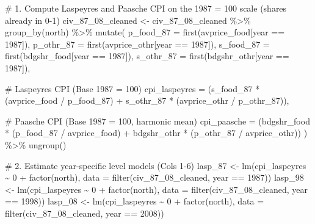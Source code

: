\documentclass[
  letterpaper,
  DIV=11,
  numbers=noendperiod]{scrartcl}
\newenvironment{Shaded}{\begin{snugshade}}{\end{snugshade}}
\newcommand{\AttributeTok}[1]{\textcolor[rgb]{0.40,0.45,0.13}{#1}}
\newcommand{\CommentTok}[1]{\textcolor[rgb]{0.37,0.37,0.37}{#1}}
\newcommand{\DecValTok}[1]{\textcolor[rgb]{0.68,0.00,0.00}{#1}}
\newcommand{\FunctionTok}[1]{\textcolor[rgb]{0.28,0.35,0.67}{#1}}
\newcommand{\NormalTok}[1]{\textcolor[rgb]{0.00,0.23,0.31}{#1}}
\newcommand{\OtherTok}[1]{\textcolor[rgb]{0.00,0.23,0.31}{#1}}
\newcommand{\SpecialCharTok}[1]{\textcolor[rgb]{0.37,0.37,0.37}{#1}}
\begin{document}
\begin{Shaded}
\begin{Highlighting}[]
\CommentTok{\# 1. Compute Laspeyres and Paasche CPI on the 1987 = 100 scale (shares already in 0{-}1)}
\NormalTok{civ\_87\_08\_cleaned }\OtherTok{\textless{}{-}}\NormalTok{ civ\_87\_08\_cleaned }\SpecialCharTok{\%\textgreater{}\%}
  \FunctionTok{group\_by}\NormalTok{(north) }\SpecialCharTok{\%\textgreater{}\%}
  \FunctionTok{mutate}\NormalTok{(}
    \AttributeTok{p\_food\_87 =} \FunctionTok{first}\NormalTok{(avprice\_food[year }\SpecialCharTok{==} \DecValTok{1987}\NormalTok{]),}
    \AttributeTok{p\_othr\_87 =} \FunctionTok{first}\NormalTok{(avprice\_othr[year }\SpecialCharTok{==} \DecValTok{1987}\NormalTok{]),}
    \AttributeTok{s\_food\_87 =} \FunctionTok{first}\NormalTok{(bdgshr\_food[year }\SpecialCharTok{==} \DecValTok{1987}\NormalTok{]),}
    \AttributeTok{s\_othr\_87 =} \FunctionTok{first}\NormalTok{(bdgshr\_othr[year }\SpecialCharTok{==} \DecValTok{1987}\NormalTok{]),}
    
    \CommentTok{\# Laspeyres CPI (Base 1987 = 100)}
    \AttributeTok{cpi\_laspeyres =}\NormalTok{ (s\_food\_87 }\SpecialCharTok{*}\NormalTok{ (avprice\_food }\SpecialCharTok{/}\NormalTok{ p\_food\_87) }\SpecialCharTok{+}
\NormalTok{                           s\_othr\_87 }\SpecialCharTok{*}\NormalTok{ (avprice\_othr }\SpecialCharTok{/}\NormalTok{ p\_othr\_87)),}
    
    \CommentTok{\# Paasche CPI (Base 1987 = 100, harmonic mean)}
    \AttributeTok{cpi\_paasche =}\NormalTok{ (bdgshr\_food }\SpecialCharTok{*}\NormalTok{ (p\_food\_87 }\SpecialCharTok{/}\NormalTok{ avprice\_food) }\SpecialCharTok{+}
\NormalTok{                           bdgshr\_othr }\SpecialCharTok{*}\NormalTok{ (p\_othr\_87 }\SpecialCharTok{/}\NormalTok{ avprice\_othr))}
\NormalTok{  ) }\SpecialCharTok{\%\textgreater{}\%}
  \FunctionTok{ungroup}\NormalTok{()}

\CommentTok{\# 2. Estimate year{-}specific level models (Cols 1{-}6)}
\NormalTok{lasp\_87 }\OtherTok{\textless{}{-}} \FunctionTok{lm}\NormalTok{(cpi\_laspeyres }\SpecialCharTok{\textasciitilde{}} \DecValTok{0} \SpecialCharTok{+} \FunctionTok{factor}\NormalTok{(north), }\AttributeTok{data =} \FunctionTok{filter}\NormalTok{(civ\_87\_08\_cleaned, year }\SpecialCharTok{==} \DecValTok{1987}\NormalTok{))}
\NormalTok{lasp\_98 }\OtherTok{\textless{}{-}} \FunctionTok{lm}\NormalTok{(cpi\_laspeyres }\SpecialCharTok{\textasciitilde{}} \DecValTok{0} \SpecialCharTok{+} \FunctionTok{factor}\NormalTok{(north), }\AttributeTok{data =} \FunctionTok{filter}\NormalTok{(civ\_87\_08\_cleaned, year }\SpecialCharTok{==} \DecValTok{1998}\NormalTok{))}
\NormalTok{lasp\_08 }\OtherTok{\textless{}{-}} \FunctionTok{lm}\NormalTok{(cpi\_laspeyres }\SpecialCharTok{\textasciitilde{}} \DecValTok{0} \SpecialCharTok{+} \FunctionTok{factor}\NormalTok{(north), }\AttributeTok{data =} \FunctionTok{filter}\NormalTok{(civ\_87\_08\_cleaned, year }\SpecialCharTok{==} \DecValTok{2008}\NormalTok{))}


\end{Highlighting}
\end{Shaded}
\end{document}
